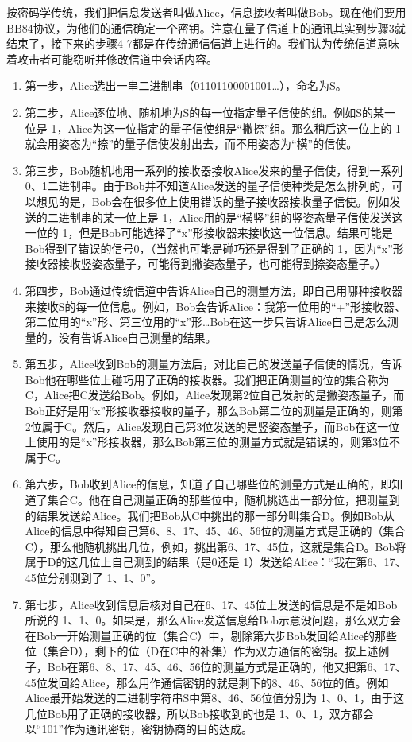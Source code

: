 \begin{enumerate}
\begin{itemize}
\begin{itemize}
			按密码学传统，我们把信息发送者叫做Alice，信息接收者叫做Bob。现在他们要用BB84协议，为他们的通信确定一个密钥。注意在量子信道上的通讯其实到步骤3就结束了，接下来的步骤4-7都是在传统通信信道上进行的。我们认为传统信道意味着攻击者可能窃听并修改信道中会话内容。
			\begin{enumerate}
				\item 第一步，Alice选出一串二进制串（01101100001001…），命名为S。
				\item 第二步，Alice逐位地、随机地为S的每一位指定量子信使的组。例如S的某一位是 1，Alice为这一位指定的量子信使组是“撇捺”组。那么稍后这一位上的 1就会用姿态为“捺”的量子信使发射出去，而不用姿态为“横”的信使。
				\item 第三步，Bob随机地用一系列的接收器接收Alice发来的量子信使，得到一系列0、1二进制串。由于Bob并不知道Alice发送的量子信使种类是怎么排列的，可以想见的是，Bob会在很多位上使用错误的量子接收器接收量子信使。例如发送的二进制串的某一位上是 1，Alice用的是“横竖”组的竖姿态量子信使发送这一位的 1，但是Bob可能选择了“x”形接收器来接收这一位信息。结果可能是Bob得到了错误的信号0，（当然也可能是碰巧还是得到了正确的 1，因为“x”形接收器接收竖姿态量子，可能得到撇姿态量子，也可能得到捺姿态量子。）
				\item 第四步，Bob通过传统信道中告诉Alice自己的测量方法，即自己用哪种接收器来接收S的每一位信息。例如，Bob会告诉Alice：我第一位用的“+”形接收器、第二位用的“x”形、第三位用的“x”形…Bob在这一步只告诉Alice自己是怎么测量的，没有告诉Alice自己测量的结果。
				\item 第五步，Alice收到Bob的测量方法后，对比自己的发送量子信使的情况，告诉Bob他在哪些位上碰巧用了正确的接收器。我们把正确测量的位的集合称为C，Alice把C发送给Bob。例如，Alice发现第2位自己发射的是撇姿态量子，而Bob正好是用“x”形接收器接收的量子，那么Bob第二位的测量是正确的，则第2位属于C。然后，Alice发现自己第3位发送的是竖姿态量子，而Bob在这一位上使用的是“x”形接收器，那么Bob第三位的测量方式就是错误的，则第3位不属于C。
				\item 第六步，Bob收到Alice的信息，知道了自己哪些位的测量方式是正确的，即知道了集合C。他在自己测量正确的那些位中，随机挑选出一部分位，把测量到的结果发送给Alice。我们把Bob从C中挑出的那一部分叫集合D。例如Bob从Alice的信息中得知自己第6、8、17、45、46、56位的测量方式是正确的（集合C），那么他随机挑出几位，例如，挑出第6、17、45位，这就是集合D。Bob将属于D的这几位上自己测到的结果（是0还是 1）发送给Alice：“我在第6、17、45位分别测到了 1、1、0”。
				\item 第七步，Alice收到信息后核对自己在6、17、45位上发送的信息是不是如Bob所说的 1、1、0。如果是，那么Alice发送信息给Bob示意没问题，那么双方会在Bob一开始测量正确的位（集合C）中，剔除第六步Bob发回给Alice的那些位（集合D），剩下的位（D在C中的补集）作为双方通信的密钥。按上述例子，Bob在第6、8、17、45、46、56位的测量方式是正确的，他又把第6、17、45位发回给Alice，那么用作通信密钥的就是剩下的8、46、56位的值。例如Alice最开始发送的二进制字符串S中第8、46、56位值分别为 1、0、1，由于这几位Bob用了正确的接收器，所以Bob接收到的也是 1、0、1，双方都会以“101”作为通讯密钥，密钥协商的目的达成。
			\end{enumerate}
			

\end{itemize}
\end{itemize}
\end{enumerate}
